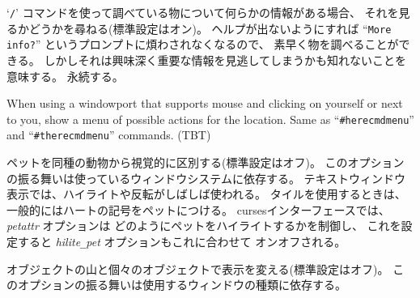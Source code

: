 `{\tt /}' コマンドを使って調べている物について何らかの情報がある場合、
それを見るかどうかを尋ねる(標準設定はオン)。
ヘルプが出ないようにすれば ``{\tt More info?}'' というプロンプトに煩わされなくなるので、
素早く物を調べることができる。
しかしそれは興味深く重要な情報を見逃してしまうかも知れないことを意味する。
永続する。
\item[\ib{herecmd\verb+_+menu}]
When using a windowport that supports mouse and clicking on yourself or
next to you, show a menu of possible actions for the location.
Same as ``{\tt \#herecmdmenu}'' and ``{\tt \#therecmdmenu}'' commands.
(TBT)
\item[\ib{hilite\verb+_+pet}]
ペットを同種の動物から視覚的に区別する(標準設定はオフ)。
このオプションの振る舞いは使っているウィンドウシステムに依存する。
テキストウィンドウ表示では、ハイライトや反転がしばしば使われる。
タイルを使用するときは、一般的にはハートの記号をペットにつける。
cursesインターフェースでは、{\it petattr\/} オプションは
どのようにペットをハイライトするかを制御し、
これを設定すると {\it hilite\verb+_+pet\/} オプションもこれに合わせて
オンオフされる。
\item[\ib{hilite\verb+_+pile}]
オブジェクトの山と個々のオブジェクトで表示を変える(標準設定はオフ)。
このオプションの振る舞いは使用するウィンドウの種類に依存する。
